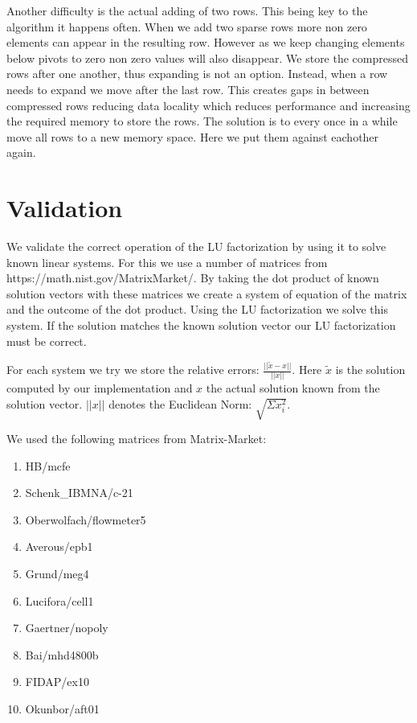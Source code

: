 \documentclass[10pt]{article}
\begin{document}
Another difficulty is the actual adding of two rows. This being key to the algorithm it happens often. When we add two sparse rows more non zero elements can appear in the resulting row. However as we keep changing elements below pivots to zero non zero values will also disappear. We store the compressed rows after one another, thus expanding is not an option. Instead, when a row needs to expand we move after the last row. This creates gaps in between compressed rows reducing data locality which reduces performance and increasing the required memory to store the rows. The solution is to every once in a while move all rows to a new memory space. Here we put them against eachother again.

\section{Validation}
\label{sec:val}
We validate the correct operation of the LU factorization by using it to solve known linear systems. For this we use a number of matrices from https://math.nist.gov/MatrixMarket/. By taking the dot product of known solution vectors with these matrices we create a system of equation of the matrix and the outcome of the dot product. Using the LU factorization we solve this system. If the solution matches the known solution vector our LU factorization must be correct. 

For each system we try we store the relative errors: $\frac{||\widetilde{x}-x||}{||x||}$. Here $\widetilde{x}$ is the solution computed by our implementation and $x$ the actual solution known from the solution vector. $||x||$ denotes the Euclidean Norm: $\sqrt{\Sigma x_i^2}$.

We used the following matrices from Matrix-Market:
\begin{multicols}{2}
\begin{enumerate}
    \item HB/mcfe
    \item Schenk\_IBMNA/c-21
    \item Oberwolfach/flowmeter5
    \item Averous/epb1
    \item Grund/meg4
    \item Lucifora/cell1
    \item Gaertner/nopoly
    \item Bai/mhd4800b
    \item FIDAP/ex10
    \item Okunbor/aft01
\end{enumerate}
\end{multicols}
\end{document}
